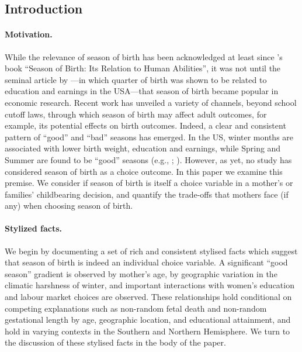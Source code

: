 \documentclass[a4paper, 12 pt]{article}
\theoremstyle{plain}
\begin{document}
\newpage
\begin{doublespace}

\section{Introduction}
\paragraph{Motivation.} While the relevance of season of birth has been acknowledged at least since \citeauthor{Huntington38}'s \citeyear{Huntington38} book ``Season of Birth: Its Relation to Human Abilities'', it was not until the seminal article by \citet{AK1991}---in which quarter of birth was shown to be related to education and earnings in the USA---that season of birth became popular in economic research. Recent work has unveiled a variety of channels, beyond school cutoff laws, through which season of birth may affect adult outcomes, for example, its potential effects on birth outcomes. Indeed, a clear and consistent pattern of ``good'' and ``bad'' seasons has emerged. In the US, winter months are associated with lower birth weight, education and earnings, while Spring and Summer are found to be ``good'' seasons (e.g., \citealp{BucklesHungerman2013}; \citealp{CS2013}). However, as yet, no study has considered season of birth as a choice outcome.  In this paper we examine this premise.  We consider if season of birth is itself a choice variable in a mother's or families' childbearing decision, and quantify the trade-offs that mothers face (if any) when choosing season of birth.

\paragraph{Stylized facts.} We begin by documenting a set of rich and consistent stylised facts which suggest that season of birth is indeed an individual choice variable.  A significant ``good season'' gradient is observed by mother's age, by geographic variation in the climatic harshness of winter, and important interactions with women's education and labour market choices are observed.  These relationships hold conditional on competing explanations such as non-random fetal death and non-random gestational length by age, geographic location, and educational attainment, and hold in varying contexts in the Southern and Northern Hemisphere.  We turn to the discussion of these stylised facts in the body of the paper.


\end{doublespace}
\end{document}
